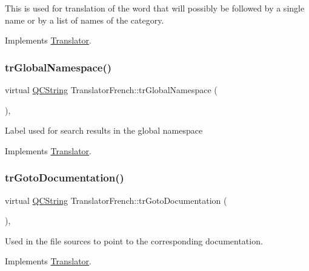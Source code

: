 This is used for translation of the word that will possibly be followed by a single name or by a list of names of the category. 

Implements \mbox{\hyperlink{class_translator}{Translator}}.

\mbox{\label{class_translator_french_ad27fc79c27e18b861acc60342462fd43}} 
\subsubsection{\texorpdfstring{trGlobalNamespace()}{trGlobalNamespace()}}
{\footnotesize\ttfamily virtual \mbox{\hyperlink{class_q_c_string}{Q\+C\+String}} Translator\+French\+::tr\+Global\+Namespace (\begin{DoxyParamCaption}{ }\end{DoxyParamCaption})\hspace{0.3cm}{\ttfamily [inline]}, {\ttfamily [virtual]}}

Label used for search results in the global namespace 

Implements \mbox{\hyperlink{class_translator}{Translator}}.

\mbox{\label{class_translator_french_a98be4cb15e54b98154028776c567add1}} 
\subsubsection{\texorpdfstring{trGotoDocumentation()}{trGotoDocumentation()}}
{\footnotesize\ttfamily virtual \mbox{\hyperlink{class_q_c_string}{Q\+C\+String}} Translator\+French\+::tr\+Goto\+Documentation (\begin{DoxyParamCaption}{ }\end{DoxyParamCaption})\hspace{0.3cm}{\ttfamily [inline]}, {\ttfamily [virtual]}}

Used in the file sources to point to the corresponding documentation. 

Implements \mbox{\hyperlink{class_translator}{Translator}}.

\mbox{\label{class_translator_french_a4a13f5e9dc5086cca6c136740f207d35}} 

